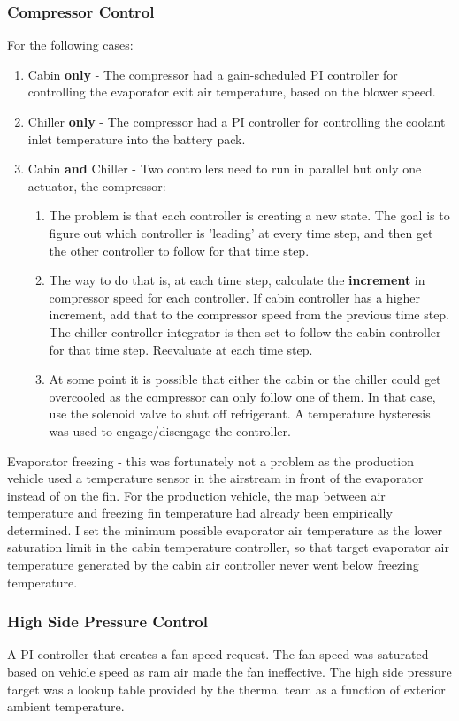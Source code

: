 \subsubsection * {Compressor Control}
For the following cases:
\begin{enumerate}
  \item Cabin \textbf{only} - The compressor had a gain-scheduled PI controller for controlling the evaporator exit air temperature, based on the blower speed.
  \item Chiller \textbf{only} - The compressor had a PI controller for controlling the coolant inlet temperature into the battery pack.
  \item Cabin \textbf{and} Chiller - Two controllers need to run in parallel but only one actuator, the compressor:
  \begin{enumerate}
  \item The problem is that each controller is creating a new state. The goal is to figure out which controller is 'leading' at every time step, and then get the other controller to follow for that time step.
  \item The way to do that is, at each time step, calculate the \textbf{increment} in compressor speed for each controller. If cabin controller has a higher increment, add that to the compressor speed from the previous time step. The chiller controller integrator is then set to follow the cabin controller for that time step. Reevaluate at each time step.
  \item At some point it is possible that either the cabin or the chiller could get overcooled as the compressor can only follow one of them. In that case, use the solenoid valve to shut off refrigerant. A temperature hysteresis was used to engage/disengage the controller.
\end{enumerate}
\end{enumerate}

\noindent
Evaporator freezing - this was fortunately not a problem as the production vehicle used a temperature sensor in the airstream in front of the evaporator instead of on the fin. For the production vehicle, the map between air temperature and freezing fin temperature had already been empirically determined. I set the minimum possible evaporator air temperature as the lower saturation limit in the cabin temperature controller, so that target evaporator air temperature generated by the cabin air controller never went below freezing temperature.

\subsubsection * {High Side Pressure Control}
A PI controller that creates a fan speed request. The fan speed was saturated based on vehicle speed as ram air made the fan ineffective. The high side pressure target was a lookup table provided by the thermal team as a function of exterior ambient temperature.

